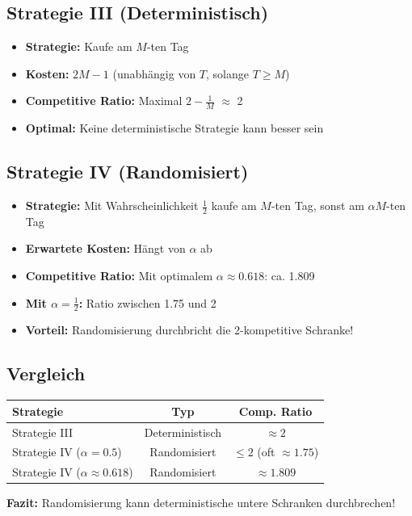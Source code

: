 \documentclass[12pt,a4paper]{article}
\theoremstyle{definition}
\begin{document}
\subsection{Strategie III (Deterministisch)}
\begin{itemize}
    \item \textbf{Strategie:} Kaufe am $M$-ten Tag
    \item \textbf{Kosten:} $2M - 1$ (unabhängig von $T$, solange $T \geq M$)
    \item \textbf{Competitive Ratio:} Maximal $2 - \frac{1}{M}$ $\approx$ 2
    \item \textbf{Optimal:} Keine deterministische Strategie kann besser sein
\end{itemize}

\subsection{Strategie IV (Randomisiert)}
\begin{itemize}
    \item \textbf{Strategie:} Mit Wahrscheinlichkeit $\frac{1}{2}$ kaufe am $M$-ten Tag, sonst am $\alpha M$-ten Tag
    \item \textbf{Erwartete Kosten:} Hängt von $\alpha$ ab
    \item \textbf{Competitive Ratio:} Mit optimalem $\alpha \approx 0.618$: ca. 1.809
    \item \textbf{Mit $\alpha = \frac{1}{2}$:} Ratio zwischen 1.75 und 2
    \item \textbf{Vorteil:} Randomisierung durchbricht die 2-kompetitive Schranke!
\end{itemize}

\subsection{Vergleich}

\begin{center}
\begin{tabular}{|l|c|c|}
\hline
\textbf{Strategie} & \textbf{Typ} & \textbf{Comp. Ratio} \\
\hline
Strategie III & Deterministisch & $\approx 2$ \\
Strategie IV ($\alpha = 0.5$) & Randomisiert & $\leq 2$ (oft $\approx 1.75$) \\
Strategie IV ($\alpha \approx 0.618$) & Randomisiert & $\approx 1.809$ \\
\hline
\end{tabular}
\end{center}

\textbf{Fazit:} Randomisierung kann deterministische untere Schranken durchbrechen!
\end{document}
